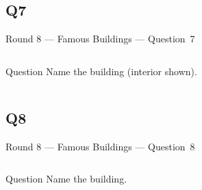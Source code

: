 \documentclass[11pt,draft]{beamer}
\begin{document}
\subsection*{Q7}
\begin{frame}[t]{Round 8 --- Famous Buildings --- \mbox{Question 7}}
    \begin{columns}[T,totalwidth=\linewidth]
        \begin{column}{0.32\linewidth}
            \begin{block}{Question}
                Name the building (interior shown).
            \end{block}
        \end{column}
        \begin{column}{0.65\linewidth}
            \begin{center}
                \texttt{[image: \{Images/johnsonwax]}.jpg}
            \end{center}
        \end{column}
    \end{columns}
\end{frame}
\subsection*{Q8}
\begin{frame}[t]{Round 8 --- Famous Buildings --- \mbox{Question 8}}
    \begin{columns}[T,totalwidth=\linewidth]
        \begin{column}{0.32\linewidth}
            \begin{block}{Question}
                Name the building.
            \end{block}
        \end{column}
        \begin{column}{0.65\linewidth}
            \begin{center}
                \texttt{[image: \{Images/hancocktower]}.jpeg}
            \end{center}
        \end{column}
    \end{columns}
\end{frame}
\end{document}
